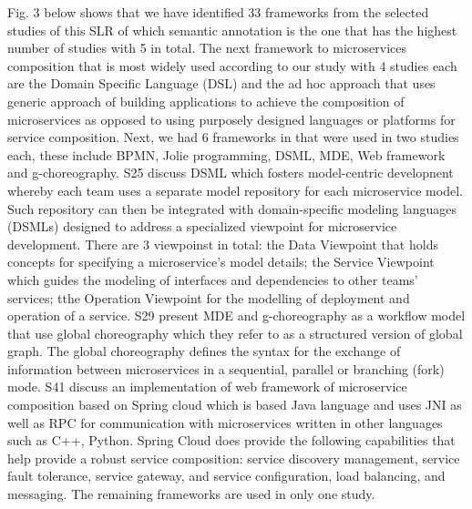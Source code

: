 \documentclass{article}
\begin{document}
\begin{multicols}{2}
Fig. 3 below shows that we have identified 33 frameworks from the selected studies of this SLR of which semantic annotation is the one that has the highest number of studies with 5 in total. The next framework to microservices composition that is most widely used according to our study with 4 studies each are the Domain Specific Language (DSL) and the ad hoc approach that uses generic approach of building applications to achieve the composition of microservices as opposed to using purposely designed languages or platforms for service composition. Next, we had 6 frameworks in that were used in two studies each, these include BPMN, Jolie programming, DSML, MDE, Web framework and g-choreography. S25 discuss DSML which fosters model-centric developnent whereby each team uses a separate model repository for each microservice model. Such repository can then be integrated with domain-specific modeling languages (DSMLs) designed to address  a specialized viewpoint for microservice development. There are 3 viewpoinst in total: the Data Viewpoint that holds concepts for specifying a microservice’s model details; the Service Viewpoint which guides the modeling of interfaces and dependencies to other teams’ services; tthe Operation Viewpoint for the modelling of deployment and operation of a service.
S29 present MDE and g-choreography as a workflow model that use global choreography which they refer to as a structured version of global graph. The global choreography defines the syntax for the exchange of information between microservices in a sequential, parallel or branching (fork) mode. 
S41 discuss an implementation of web framework of microservice composition based on Spring cloud which is based Java language and uses 
JNI as well as RPC for communication with microservices written in other languages such as C++, Python. Spring Cloud does provide the following capabilities that help provide a robust service composition: service discovery management, service fault tolerance, service gateway, and service configuration, load balancing, and messaging. The remaining frameworks are used in only one study. 


\end{multicols}
\end{document}

